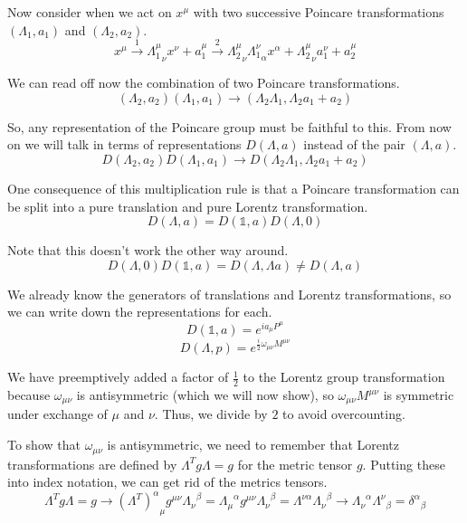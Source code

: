 \documentclass[12pt]{article}
\begin{document}
Now consider when we act on $x^\mu$ with two successive Poincare transformations $(\Lambda_1,a_1)$ and $(\Lambda_2,a_2)$.
\begin{equation}
    x^\mu\xrightarrow{1}{\Lambda_1^\mu}_\nu x^\nu+a_1^\mu\xrightarrow{2} {\Lambda_2^\mu}_\nu{\Lambda_1^\nu}_\alpha x^\alpha+{\Lambda_2^\mu}_\nu a_1^\nu +a_2^\mu
\end{equation}

We can read off now the combination of two Poincare transformations.
\begin{equation}
    (\Lambda_2,a_2)(\Lambda_1,a_1)\rightarrow(\Lambda_2\Lambda_1,\Lambda_2 a_1 + a_2)
\end{equation}

So, any representation of the Poincare group must be faithful to this. From now on we will talk in terms of representations $D(\Lambda,a)$ instead of the pair $(\Lambda,a)$.
\begin{equation}
    D(\Lambda_2,a_2)D(\Lambda_1,a_1)\rightarrow D(\Lambda_2\Lambda_1,\Lambda_2 a_1 + a_2)
\end{equation}

One consequence of this multiplication rule is that a Poincare transformation can be split into a pure translation and pure Lorentz transformation.
\begin{equation}
    D(\Lambda,a)=D(\mathbb{1},a)D(\Lambda,0)
\end{equation}

Note that this doesn't work the other way around.
\begin{equation}
    D(\Lambda,0)D(\mathbb{1},a)=D(\Lambda,\Lambda a)\neq D(\Lambda,a)
\end{equation}

We already know the generators of translations and Lorentz transformations, so we can write down the representations for each.
\begin{equation}
    D(\mathbb{1},a)=e^{i a_\mu P^\mu}
\end{equation}
\begin{equation}
    D(\Lambda,p)=e^{\frac{i}{2}\omega_{\mu\nu}M^{\mu\nu}}
\end{equation}

We have preemptively added a factor of $\frac{1}{2}$ to the Lorentz group transformation because $\omega_{\mu\nu}$ is antisymmetric (which we will now show), so $\omega_{\mu\nu}M^{\mu\nu}$ is symmetric under exchange of $\mu$ and $\nu$. Thus, we divide by $2$ to avoid overcounting. 

To show that $\omega_{\mu\nu}$ is antisymmetric, we need to remember that Lorentz transformations are defined by $\Lambda^T g \Lambda =g$ for the metric tensor $g$. Putting these into index notation, we can get rid of the metrics tensors.
\begin{equation}
    \Lambda^Tg\Lambda=g\rightarrow{(\Lambda^T)^\alpha}_\mu g^{\mu\nu} {\Lambda_\nu}^\beta={\Lambda_\mu}^\alpha g^{\mu\nu} {\Lambda_\nu}^\beta=\Lambda^{\nu\alpha}{\Lambda_\nu}^\beta\rightarrow{\Lambda_\nu}^\alpha{\Lambda^\nu}_\beta={\delta^\alpha}_\beta
\end{equation}
\end{document}
